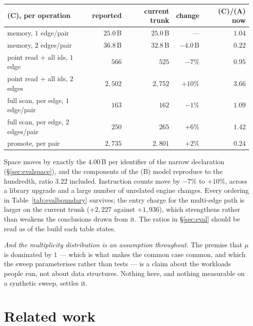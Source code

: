 \documentclass[11pt,a4paper]{article}
\theoremstyle{plain}
\theoremstyle{definition}
\theoremstyle{remark}
\begin{document}
\begin{center}
\small
\begin{tabular}{@{}lrrrr@{}}
\toprule
(C), per operation & reported & current trunk & change & (C)/(A) now \\
\midrule
memory, $1$ edge/pair               & $25.0$\,B   & $25.0$\,B   & ---       & $1.04$ \\
memory, $2$ edges/pair              & $36.8$\,B   & $32.8$\,B   & $-4.0$\,B & $0.22$ \\
point read $+$ all ids, $1$ edge    & $566$       & $525$       & $-7\%$    & $0.95$ \\
point read $+$ all ids, $2$ edges   & $2{,}502$   & $2{,}752$   & $+10\%$   & $3.66$ \\
full scan, per edge, $1$ edge/pair  & $163$       & $162$       & $-1\%$    & $1.09$ \\
full scan, per edge, $2$ edges/pair & $250$       & $265$       & $+6\%$    & $1.42$ \\
promote, per pair                   & $2{,}735$   & $2{,}801$   & $+2\%$    & $0.24$ \\
\bottomrule
\end{tabular}
\end{center}

\noindent
Space moves by exactly the $4.00$\,B per identifier of the narrow declaration
(\S\ref{sec:evalspace}), and the components of the (B) model reproduce to the
hundredth, ratio $3.22$ included. Instruction counts move by $-7\%$ to $+10\%$,
across a library upgrade and a large number of unrelated engine changes. Every
ordering in Table~\ref{tab:evalboundary} survives; the entry charge for the
multi-edge path is larger on the current trunk ($+2{,}227$ against $+1{,}936$),
which strengthens rather than weakens the conclusions drawn from it. The
ratios in \S\ref{sec:eval} should be read as of the build each table states.

\emph{And the multiplicity distribution is an assumption throughout.} The
premise that $\mu$ is dominated by $1$ --- which is what makes the common case
common, and which the sweep parameterises rather than tests --- is a claim about
the workloads people run, not about data structures. Nothing here, and nothing
measurable on a synthetic sweep, settles it.

\section{Related work}
\label{sec:related}
\end{document}

